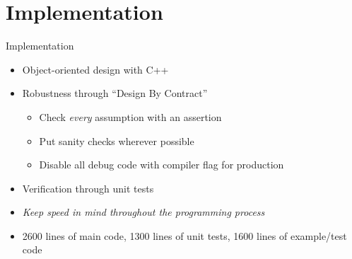 \documentclass[color={usenames, dvipsnames},ignorenonframetext]{beamer}
\begin{document}
\section{Implementation}
\begin{frame}{Implementation}
\begin{itemize}
  \item Object-oriented design with C++
  \item Robustness through ``Design By Contract''
    \begin{itemize}
      \item Check \emph{every} assumption with an assertion
      \item Put sanity checks wherever possible
      \item Disable all debug code with compiler flag for production
    \end{itemize}
  \item Verification through unit tests
  \item \emph{Keep speed in mind throughout the programming process}
  \item 2600 lines of main code, 1300 lines of unit tests, 1600 lines of
    example/test code
\end{itemize}
\end{frame}
\end{document}
